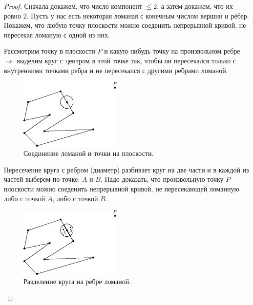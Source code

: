 \documentclass[12pt]{article}
\theoremstyle{definition}
\begin{document}
\begin{proof}
	Сначала докажем, что число компонент $\leq 2$, а затем докажем, что их ровно $2$. Пусть у нас есть некоторая ломаная с конечным числом вершин и рёбер. Покажем, что любую точку плоскости можно соеденить непрерывной кривой, не пересекая ломаную с одной из них. 
	
	Рассмотрим точку в плоскости $P$ и какую-нибудь точку на произвольном ребре $\Rightarrow$ выделим круг с центром в этой точке так, чтобы он пересекался только с внутренними точками ребра и не пересекался с другими ребрами ломаной.
	\begin{figure}[H]
		\centering
		\includegraphics[width=0.45\textwidth]{GATL3_2.eps}
		\caption{Соединение ломаной и точки на плоскости.}
		\label{3_2}
	\end{figure}
	Пересечение круга с ребром (диаметр) разбивает круг на две части и в каждой из частей выберем по точке: $A$ и $B$. Надо доказать, что произвольную точку $P$ плоскости можно соеденить непрерывной кривой, не пересекающей ломанную либо с точкой $A$, либо с точкой $B$.
	\begin{figure}[H]
		\centering
		\includegraphics[width=0.45\textwidth]{GATL3_3.eps}
		\caption{Разделение круга на ребре ломаной.}
		\label{3_3}
	\end{figure}
	
	
\end{proof}
\end{document}
